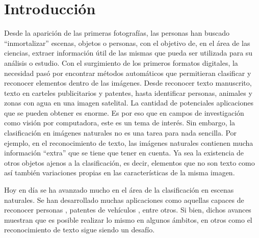 \newpage
\section{Introducción}

	Desde la aparición de las primeras fotografías, las personas han buscado ``inmortalizar'' escenas, objetos o personas, con el objetivo de, en el área de las ciencias, extraer información útil de las mismas que pueda ser utilizada para su análisis o estudio. Con el surgimiento de los primeros formatos digitales, la necesidad pasó por encontrar métodos automáticos que permitieran clasificar y reconocer elementos dentro de las imágenes. Desde reconocer texto manuscrito, texto en carteles publicitarios y patentes, hasta identificar personas, animales y zonas con agua en una imagen satelital. La cantidad de potenciales aplicaciones que se pueden obtener es enorme. Es por eso que en campos de investigación como visión por computadora, este es un tema de interés. Sin embargo, la clasificación en imágenes naturales no es una tarea para nada sencilla. Por ejemplo, en el reconocimiento de texto, las imágenes naturales contienen mucha información ``extra'' que se tiene que tener en cuenta. Ya sea la existencia de otros objetos ajenos a la clasificación, es decir, elementos que no son texto como así también variaciones propias en las características de la misma imagen.
	
	Hoy en día se ha avanzado mucho en el área de la clasificación en escenas naturales. Se han desarrollado muchas aplicaciones como aquellas capaces de reconocer personas \cite{DT05}, patentes de vehículos \cite{DAB}, entre otros. Si bien, dichos avances muestran que es posible realizar lo mismo en algunos ámbitos, en otros como el reconocimiento de texto sigue siendo un desafío.
	
	
	
	

	
	
	
	
	

